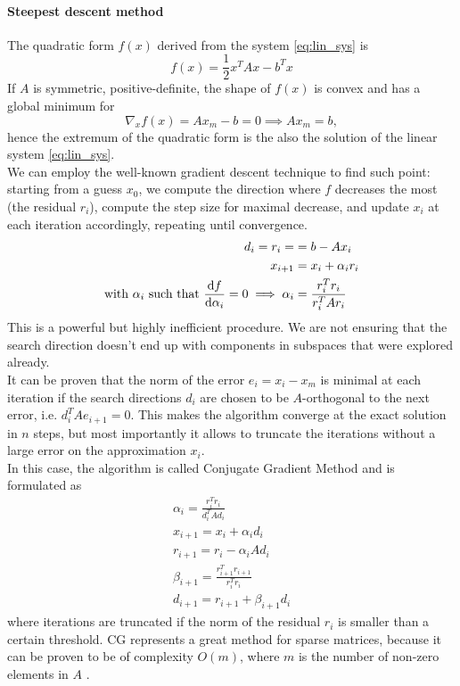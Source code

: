 \paragraph{Steepest descent method}
The quadratic form $f(x)$ derived from the system \eqref{eq:lin_sys} is
\begin{equation}
    \label{eq:quad_form}
    f(x) = \frac 1 2 x^T A x - b^T x
\end{equation}
If $A$ is symmetric, positive-definite, the shape of $f(x)$ is convex and has a global minimum for
\begin{equation}
    \label{eq:quad_form_min}
    \nabla_x f(x) = A x_m - b = 0 \implies A x_m = b,
\end{equation}
hence the extremum of the quadratic form is the also the solution of the linear system \eqref{eq:lin_sys}.
\\We can employ the well-known gradient descent technique \cite{PainlessCGM} to find such point: starting from a guess $x_0$, we compute the direction where $f$ decreases the most (the residual $r_i$), compute the step size for maximal decrease, and update $x_i$ at each iteration accordingly, repeating until convergence.
\begin{align}
d_i = r_i =&= b - A x_i \\
x_{i+1} &= x_i +\alpha_i r_i \\
\text{with } \alpha_i \text{ such that } \dv{f}{\alpha_i} = 0 \implies \alpha_i &= \frac{r_i^T r_i}{r_i^T A r_i}
\end{align}
This is a powerful but highly inefficient procedure. We are not ensuring that the search direction doesn't end up with components in subspaces that were explored already.
\\It can be proven \cite{PainlessCGM} that the norm of the error $e_i = x_i - x_m$ is minimal at each iteration if the search directions $d_i$ are chosen to be $A$-orthogonal to the next error, i.e. $d_i^T A e_{i+1} = 0$. This makes the algorithm converge at the exact solution in $n$ steps, but most importantly it allows to truncate the iterations without a large error on the approximation $x_i$.
\\In this case, the algorithm is called Conjugate Gradient Method and is formulated as 
\begin{align}
    \label{eq:cg_method}
    \alpha_i = \frac{r_i^T r_i}{d_i^T A d_i}  
    \\x_{i+1} = x_i + \alpha_i d_i
    \\r_{i+1} = r_i - \alpha_i A d_i
    \\\beta_{i+1} = \frac{r_{i+1}^T r_{i+1}}{r_i^T r_i}
    \\d_{i+1} = r_{i+1} + \beta_{i+1} d_i
\end{align}
where iterations are truncated if the norm of the residual $r_i$ is smaller than a certain threshold.
CG represents a great method for sparse matrices, because it can be proven to be of complexity $O(m)$, where $m$ is the number of non-zero elements in $A$ \cite{PainlessCGM}.
